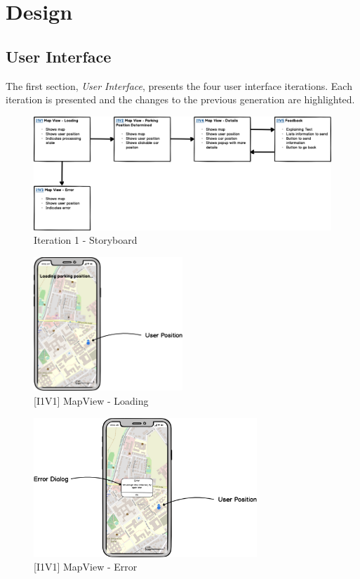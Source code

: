 \chapter{Design}

\section{User Interface}
The first section, \textit{User Interface}, presents the four user interface iterations. Each iteration is presented and the changes to the previous generation are highlighted.


\begin{figure}[H]
    \centering
    \includegraphics[width=\textwidth]{images/UI/Iteration1-Overview.png}
    \caption{Iteration 1 - Storyboard}
    \label{fig:i1story}
\end{figure}

\begin{figure}[H]
    \centering
    \includegraphics[width=0.5\textwidth]{images/UI/[I1V1]MapView-Loading.png}
    \caption{[I1V1] MapView - Loading}
    \label{fig:i1v1}
\end{figure}

\begin{figure}[H]
    \centering
    \includegraphics[width=0.75\textwidth]{images/UI/[I1V2]MapView-Error.png}
    \caption{[I1V1] MapView - Error}
    \label{fig:i1v2}
\end{figure}

